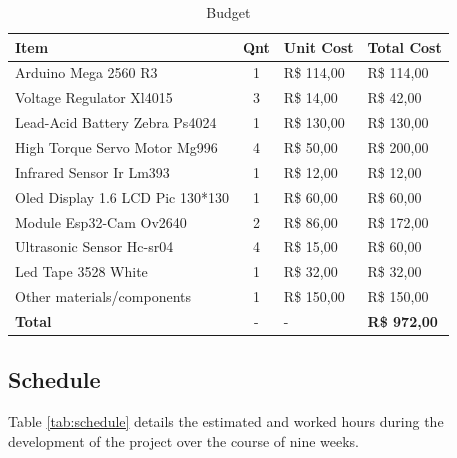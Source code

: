 \documentclass[a4paper,11pt]{article}
\begin{document}
\begin{table}[H]
  \small
  \caption{\small{Budget}}
  \begin{center}
    \begin{tabular}{|l|c|l|l|}
      \hline
      \textbf{Item}                    & \textbf{Qnt} & \textbf{Unit Cost} & \textbf{Total Cost} \\ \hline
      Arduino Mega 2560 R3             & 1            & R\$ 114,00         & R\$ 114,00          \\ \hline
      Voltage Regulator Xl4015         & 3            & R\$ 14,00          & R\$ 42,00           \\ \hline
      Lead-Acid Battery Zebra Ps4024   & 1            & R\$ 130,00         & R\$ 130,00          \\ \hline
      High Torque Servo Motor Mg996    & 4            & R\$ 50,00          & R\$ 200,00          \\ \hline
      Infrared Sensor Ir Lm393         & 1            & R\$ 12,00          & R\$ 12,00           \\ \hline
      Oled Display 1.6 LCD Pic 130*130 & 1            & R\$ 60,00          & R\$ 60,00           \\ \hline
      Module Esp32-Cam Ov2640          & 2            & R\$ 86,00          & R\$ 172,00          \\ \hline
      Ultrasonic Sensor Hc-sr04        & 4            & R\$ 15,00          & R\$ 60,00           \\ \hline
      Led Tape 3528 White              & 1            & R\$ 32,00          & R\$ 32,00           \\ \hline
      Other materials/components       & 1            & R\$ 150,00         & R\$ 150,00          \\ \hline
      \textbf{Total}                   & -            & -                  & \textbf{R\$ 972,00} \\ \hline
    \end{tabular}
  \end{center}
  \label{tab:budget}
\end{table}

\subsection{Schedule}
Table \ref{tab:schedule} details the estimated and worked hours during the development of the project over the course of nine weeks.
\end{document}
